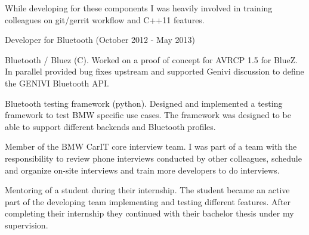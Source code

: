 \documentclass[alan.tex]{subfiles}
\begin{document}
\begin{my_desc}
\begin{my_bullets}
          \item While developing for these components I was heavily involved in training colleagues on git/gerrit
              workflow and C++11 features.
        \end{my_bullets}
      \item[Developer] for Bluetooth (October 2012 - May 2013)
        \begin{my_bullets}
          \item Bluetooth / Bluez (C).  Worked on a proof of concept for AVRCP 1.5 for BlueZ.
            In parallel provided bug fixes upstream and supported Genivi discussion to define the
            GENIVI Bluetooth API.
          \item Bluetooth testing framework (python). Designed and implemented a testing framework to
            test BMW specific use cases. The framework was designed to be able to support different backends and
            Bluetooth profiles.
        \end{my_bullets}
      \item[Member] of the BMW CarIT core interview team. I was part of a team with the responsibility to review phone interviews
        conducted by other colleagues, schedule and organize on-site interviews and train more developers to do interviews.
      \item[Mentoring] of a student during their internship. The student became an active part of the developing
        team implementing and testing different features. After completing their internship they continued with their bachelor thesis
        under my supervision.
    \end{my_desc}
\end{document}
